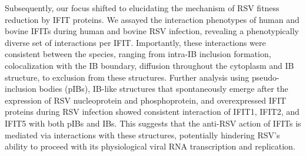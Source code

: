 Subsequently, our focus shifted to elucidating the mechanism of RSV fitness reduction by IFIT proteins. We assayed the interaction phenotypes of human and bovine IFITs during human and bovine RSV infection, revealing a phenotypically diverse set of interactions per IFIT. Importantly, these interactions were consistent between the species, ranging from intra-IB inclusion formation, colocalization with the IB boundary, diffusion throughout the cytoplasm and IB structure, to exclusion from these structures. Further analysis using pseudo-inclusion bodies (pIBs), IB-like structures that spontaneously emerge after the expression of RSV nucleoprotein and phosphoprotein, and overexpressed IFIT proteins during RSV infection showed consistent interaction of IFIT1, IFIT2, and IFIT5 with both pIBs and IBs. This suggests that the anti-RSV action of IFITs is mediated via interactions with these structures, potentially hindering RSV's ability to proceed with its physiological viral RNA transcription and replication.

